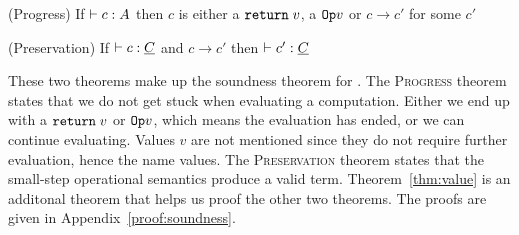 \begin{theorem}
\label{thm:progress}
(Progress) If $\vdash c \mathrel{:} A$ then $c$ is either a $\mathtt{return}\; v$, a $\mathtt{Op} v$ or $c \longrightarrow c'$ for some $c'$
\end{theorem}

\begin{theorem}
\label{thm:preservation}
(Preservation) If $\vdash c \mathrel{:} \underline{C}$ and $c \longrightarrow c'$ then $\vdash c' \mathrel{:} \underline{C}$
\end{theorem}

These two theorems make up the soundness theorem for \core. The \textsc{Progress} theorem states that we do not get stuck when evaluating a computation. Either we end up with a $\mathtt{return}\; v$ or $\mathtt{Op} v$, which means the evaluation has ended, or we can continue evaluating. Values $v$ are not mentioned since they do not require further evaluation, hence the name values. The \textsc{Preservation} theorem states that the small-step operational semantics produce a valid term. Theorem~\ref{thm:value} is an additonal theorem that helps us proof the other two theorems. The proofs are given in Appendix~\ref{proof:soundness}.

